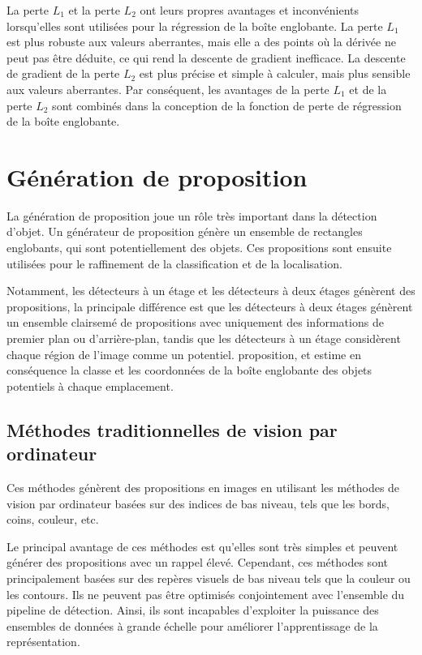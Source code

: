           La perte $L_1$ et la perte $L_2$ ont leurs propres avantages et inconvénients lorsqu'elles sont utilisées pour la régression de la boîte englobante.
          La perte $L_1$ est plus robuste aux valeurs aberrantes, mais elle a des points où la dérivée ne peut pas être déduite, ce qui rend la descente de gradient inefficace.
          La descente de gradient de la perte $L_2$ est plus précise et simple à calculer, mais plus sensible aux valeurs aberrantes.
          Par conséquent, les avantages de la perte $L_1$ et de la perte $L_2$ sont combinés dans la conception de la fonction de perte de régression de la boîte englobante.

\section{Génération de proposition}
     La génération de proposition joue un rôle très important dans la détection d'objet. Un générateur de proposition génère un ensemble de rectangles englobants, qui sont potentiellement des objets. Ces propositions sont ensuite utilisées pour le raffinement de la classification et de la localisation. 
     
     Notamment, les détecteurs à un étage et les détecteurs à deux étages génèrent des propositions, la principale différence est que les détecteurs à deux étages génèrent un ensemble clairsemé de propositions avec uniquement des informations de premier plan ou d'arrière-plan, tandis que les détecteurs à un étage considèrent chaque région de l'image comme un potentiel. proposition, et estime en conséquence la classe et les coordonnées de la boîte englobante des objets potentiels à chaque emplacement.
     
     \subsection{Méthodes traditionnelles de vision par ordinateur}
     Ces méthodes génèrent des propositions en images en utilisant les méthodes de vision par ordinateur basées sur des indices de bas niveau, tels que les bords, coins, couleur, etc. 

     Le principal avantage de ces méthodes est qu'elles sont très simples et peuvent générer des propositions avec un rappel élevé. Cependant, ces méthodes sont principalement basées sur des repères visuels de bas niveau tels que la couleur ou les contours. Ils ne peuvent pas être optimisés conjointement avec l'ensemble du pipeline de détection. Ainsi, ils sont incapables d'exploiter la puissance des ensembles de données à grande échelle pour améliorer l'apprentissage de la représentation.

